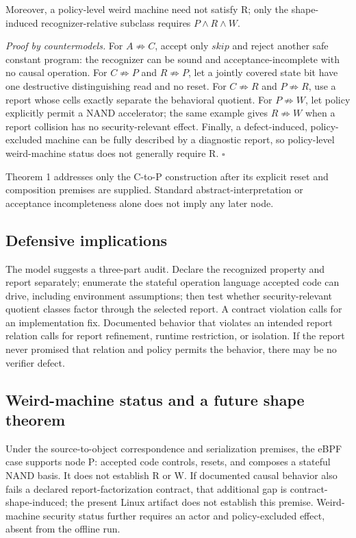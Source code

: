 \documentclass[conference]{IEEEtran}
\begin{document}
Moreover, a policy-level weird machine need not satisfy R; only the shape-induced recognizer-relative subclass requires $P\land R\land W$.

\emph{Proof by countermodels.} For $A\not\Rightarrow C$, accept only $\mathit{skip}$ and reject another safe constant program: the recognizer can be sound and acceptance-incomplete with no causal operation. For $C\not\Rightarrow P$ and $R\not\Rightarrow P$, let a jointly covered state bit have one destructive distinguishing read and no reset. For $C\not\Rightarrow R$ and $P\not\Rightarrow R$, use a report whose cells exactly separate the behavioral quotient. For $P\not\Rightarrow W$, let policy explicitly permit a NAND accelerator; the same example gives $R\not\Rightarrow W$ when a report collision has no security-relevant effect. Finally, a defect-induced, policy-excluded machine can be fully described by a diagnostic report, so policy-level weird-machine status does not generally require R. \hfill$\square$

Theorem 1 addresses only the C-to-P construction after its explicit reset and composition premises are supplied. Standard abstract-interpretation or acceptance incompleteness alone does not imply any later node.

\subsection{Defensive implications}

The model suggests a three-part audit. Declare the recognized property and report separately; enumerate the stateful operation language accepted code can drive, including environment assumptions; then test whether security-relevant quotient classes factor through the selected report. A contract violation calls for an implementation fix. Documented behavior that violates an intended report relation calls for report refinement, runtime restriction, or isolation. If the report never promised that relation and policy permits the behavior, there may be no verifier defect.

\subsection{Weird-machine status and a future shape theorem}

Under the source-to-object correspondence and serialization premises, the eBPF case supports node P: accepted code controls, resets, and composes a stateful NAND basis. It does not establish R or W. If documented causal behavior also fails a declared report-factorization contract, that additional gap is contract-shape-induced; the present Linux artifact does not establish this premise. Weird-machine security status further requires an actor and policy-excluded effect, absent from the offline run.
\end{document}
